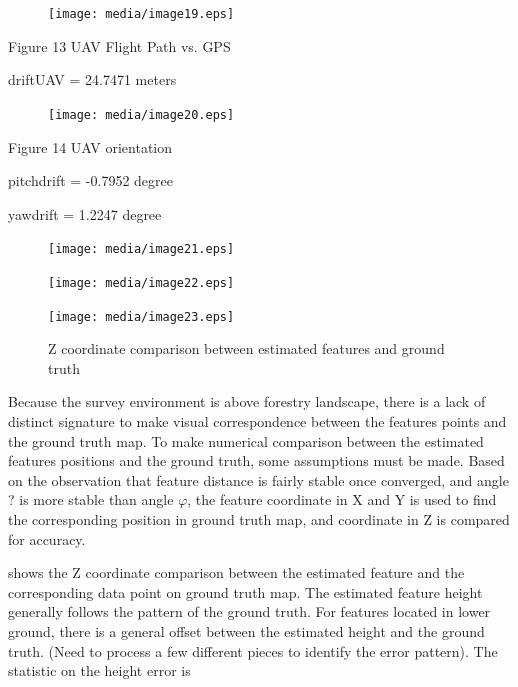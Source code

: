 \begin{figure}[h]
\centering
\texttt{[image: media/image19.eps]}
\end{figure}


\begin{center}Figure 13 UAV Flight Path vs. GPS\end{center}

driftUAV = 24.7471 meters

\begin{figure}[h]
\centering
\texttt{[image: media/image20.eps]}
\end{figure}


\begin{center}Figure 14 UAV orientation\end{center}

pitchdrift = -0.7952 degree

yawdrift = 1.2247 degree

\begin{figure}[h]
\centering
\texttt{[image: media/image21.eps]}
\end{figure}


\begin{figure}[h]
\centering
\texttt{[image: media/image22.eps]}
\end{figure}


\begin{figure}[h]
\centering
\texttt{[image: media/image23.eps]}
\caption{\label{figure:_Ref349487278} Z coordinate comparison between 
estimated features and ground truth}
\end{figure}



Because the survey environment is above forestry landscape, there is a 
lack of distinct signature to make visual correspondence between the 
features points and the ground truth map. To make numerical comparison 
between the estimated features positions and the ground truth, some 
assumptions must be made. Based on the observation that feature distance 
is fairly stable once converged, and angle ? is more stable than angle $
\varphi $, the feature coordinate in X and Y is used to find the 
corresponding position in ground truth map, and coordinate in Z is 
compared for accuracy. 

 shows the Z coordinate comparison between the estimated feature and the 
corresponding data point on ground truth map. The estimated feature 
height generally follows the pattern of the ground truth. For features 
located in lower ground, there is a general offset between the estimated 
height and the ground truth. (Need to process a few different pieces to 
identify the error pattern). The statistic on the height error is

